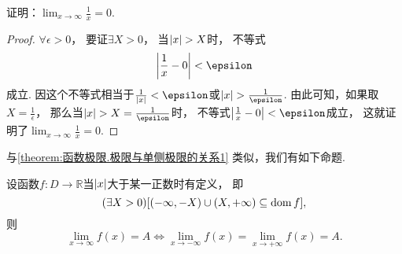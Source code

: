 \begin{example}
证明：\(\lim_{x\to\infty} \frac1x = 0\).
\begin{proof}
\(\forall\epsilon>0\)，
要证\(\exists X > 0\)，
当\(\abs{x}>X\)时，
不等式\[
	\abs{\frac1x-0}<\epsilon
\]成立.
因这个不等式相当于\(\frac{1}{\abs{x}}<\epsilon\)或\(\abs{x}>\frac{1}{\epsilon}\).
由此可知，如果取\(X=\frac{1}{\epsilon}\)，
那么当\(\abs{x}>X=\frac{1}{\epsilon}\)时，
不等式\(\abs{\frac1x-0}<\epsilon\)成立，
这就证明了\(\lim_{x\to\infty} \frac1x = 0\).
\end{proof}
\end{example}

与\cref{theorem:函数极限.极限与单侧极限的关系1} 类似，我们有如下命题.
\begin{proposition}\label{theorem:函数极限.极限与单侧极限的关系2}
设函数\(f\colon D\to\mathbb{R}\)当\(\abs{x}\)大于某一正数时有定义，
即\[
	(\exists X>0)
	[(-\infty,-X)\cup(X,+\infty) \subseteq \operatorname{dom} f],
\]
则\[
	\lim_{x \to \infty} f(x) = A
	\iff
	\lim_{x \to -\infty} f(x) = \lim_{x \to +\infty} f(x) = A.
\]
\end{proposition}
